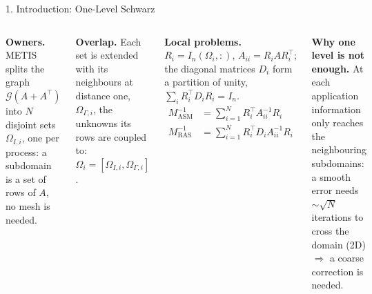 \documentclass[aspectratio=169,10pt]{beamer}
\begin{document}
\begin{frame}{1. Introduction: One-Level Schwarz}
  \small
  \begin{columns}[T,onlytextwidth]
    \setlength{\parskip}{3pt}
    \textbf{\color{schwarz}Owners.} METIS splits the graph $\mathcal{G}(A+A^\top)$ into $N$ disjoint sets
    $\Omega_{I,i}$, one per process: a subdomain is a set of rows of $A$, no mesh is needed.

    \textbf{\color{schwarz}Overlap.} Each set is extended with its neighbours at distance one, $\Omega_{\Gamma,i}$,
    the unknowns its rows are coupled to: $\Omega_i=[\Omega_{I,i},\Omega_{\Gamma,i}]$.

    \textbf{\color{schwarz}Local problems.} $R_i=I_n(\Omega_i,:)$, $A_{ii}=R_iAR_i^\top$; the diagonal matrices
    $D_i$ form a partition of unity, $\sum_i R_i^\top D_iR_i=I_n$.
    \vspace{-1mm}
    \begin{align*}
      M^{-1}_{\mathrm{ASM}} &= \textstyle\sum_{i=1}^{N}R_i^\top A_{ii}^{-1}R_i\\[1mm]
      M^{-1}_{\mathrm{RAS}} &= \textstyle\sum_{i=1}^{N}R_i^\top D_iA_{ii}^{-1}R_i
    \end{align*}

    \textbf{\color{schwarz}Why one level is not enough.} At each application information only reaches
    the \alert{neighbouring} subdomains: a smooth error needs $\sim\!\sqrt{N}$ iterations to cross the
    domain (2D) $\Rightarrow$ a \alert{coarse correction} is needed.


\end{columns}
\end{frame}
\end{document}
